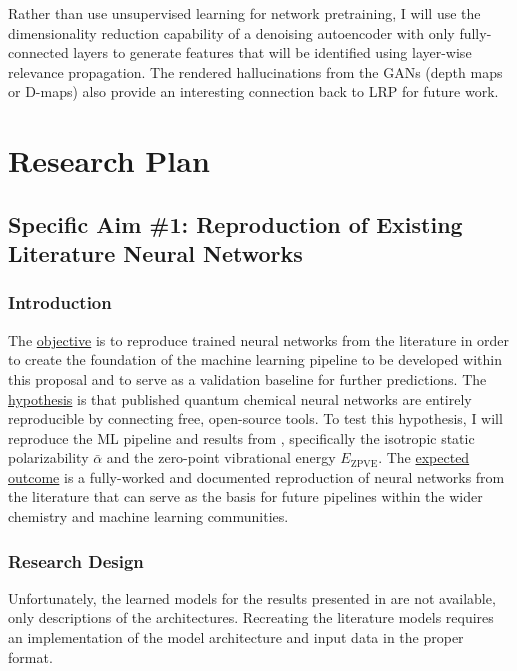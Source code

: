 \documentclass[12pt]{article}
\begin{document}
Rather than use unsupervised learning for network pretraining, I will use the dimensionality reduction capability of a denoising autoencoder\cite{VincentPLarochelleH2008} with only fully-connected layers to generate features that will be identified using layer-wise relevance propagation. The rendered hallucinations from the GANs (depth maps or D-maps) also provide an interesting connection back to LRP for future work.

\section{Research Plan}
\label{sec:orgdd04246}

\subsection{Specific Aim \#1: Reproduction of Existing Literature Neural Networks}
\label{sec:orga60e01a}

\subsubsection{Introduction}
\label{sec:org4f0e342}

The \uline{objective} is to reproduce trained neural networks from the literature in order to create the foundation of the machine learning pipeline to be developed within this proposal and to serve as a validation baseline for further predictions. The \uline{hypothesis} is that published quantum chemical neural networks are entirely reproducible by connecting free, open-source tools. To test this hypothesis, I will reproduce the ML pipeline and results from \parencite{2017arXiv170205532F}, specifically the isotropic static polarizability \(\bar{\alpha}\) and the zero-point vibrational energy \(E_{\text{ZPVE}}\). The \uline{expected outcome} is a fully-worked and documented reproduction of neural networks from the literature that can serve as the basis for future pipelines within the wider chemistry and machine learning communities.

\subsubsection{Research Design}
\label{sec:orgdf3ccab}

Unfortunately, the learned models for the results presented in \parencite{2017arXiv170205532F} are not available, only descriptions of the architectures. Recreating the literature models requires an implementation of the model architecture and input data in the proper format.
\end{document}
